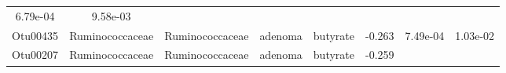 \documentclass[11pt,]{article}
\begin{document}
\begin{longtable}[]{@{}cccccccc@{}}
\begin{minipage}[t]{0.08\columnwidth}
6.79e-04\strut
\end{minipage} & \begin{minipage}[t]{0.08\columnwidth}\centering\strut
9.58e-03\strut
\end{minipage}\tabularnewline
\begin{minipage}[t]{0.08\columnwidth}\centering\strut
Otu00435\strut
\end{minipage} & \begin{minipage}[t]{0.15\columnwidth}\centering\strut
Ruminococcaceae\strut
\end{minipage} & \begin{minipage}[t]{0.15\columnwidth}\centering\strut
Ruminococcaceae\strut
\end{minipage} & \begin{minipage}[t]{0.08\columnwidth}\centering\strut
adenoma\strut
\end{minipage} & \begin{minipage}[t]{0.09\columnwidth}\centering\strut
butyrate\strut
\end{minipage} & \begin{minipage}[t]{0.07\columnwidth}\centering\strut
-0.263\strut
\end{minipage} & \begin{minipage}[t]{0.08\columnwidth}\centering\strut
7.49e-04\strut
\end{minipage} & \begin{minipage}[t]{0.08\columnwidth}\centering\strut
1.03e-02\strut
\end{minipage}\tabularnewline
\begin{minipage}[t]{0.08\columnwidth}\centering\strut
Otu00207\strut
\end{minipage} & \begin{minipage}[t]{0.15\columnwidth}\centering\strut
Ruminococcaceae\strut
\end{minipage} & \begin{minipage}[t]{0.15\columnwidth}\centering\strut
Ruminococcaceae\strut
\end{minipage} & \begin{minipage}[t]{0.08\columnwidth}\centering\strut
adenoma\strut
\end{minipage} & \begin{minipage}[t]{0.09\columnwidth}\centering\strut
butyrate\strut
\end{minipage} & \begin{minipage}[t]{0.07\columnwidth}\centering\strut
-0.259\strut
\end{minipage} & \begin{minipage}[t]{0.08\columnwidth}\centering\strut

\end{minipage}
\end{longtable}
\end{document}
